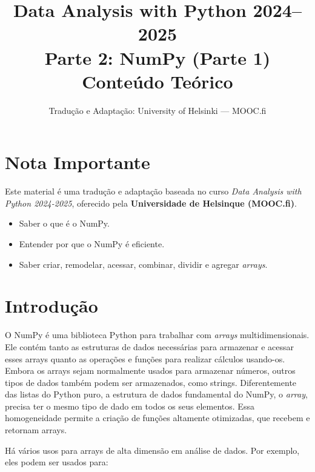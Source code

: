 \documentclass[11pt,a4paper]{article}
\title{\textbf{Data Analysis with Python 2024--2025}\\Parte 2: NumPy (Parte 1)\\\large Conteúdo Teórico}
\author{Tradução e Adaptação: University of Helsinki --- MOOC.fi}
\date{}
\begin{document}
\maketitle

\section*{Nota Importante}
Este material é uma tradução e adaptação baseada no curso \textit{Data Analysis with Python 2024-2025}, oferecido pela \textbf{Universidade de Helsinque (MOOC.fi)}.

\begin{objetivos}
\begin{itemize}
\item Saber o que é o NumPy.
\item Entender por que o NumPy é eficiente.
\item Saber criar, remodelar, acessar, combinar, dividir e agregar \emph{arrays}.
\end{itemize}
\end{objetivos}

\tableofcontents
\newpage

\section{Introdução}

O NumPy é uma biblioteca Python para trabalhar com \emph{arrays}
multidimensionais. Ele contém tanto as estruturas de dados necessárias
para armazenar e acessar esses arrays quanto as operações e funções para
realizar cálculos usando-os. Embora os arrays sejam normalmente usados
para armazenar números, outros tipos de dados também podem ser
armazenados, como strings. Diferentemente das listas do Python puro, a
estrutura de dados fundamental do NumPy, o \emph{array}, precisa ter o
mesmo tipo de dado em todos os seus elementos. Essa homogeneidade
permite a criação de funções altamente otimizadas, que recebem e
retornam arrays.

Há vários usos para arrays de alta dimensão em análise de dados. Por
exemplo, eles podem ser usados para:
\end{document}
